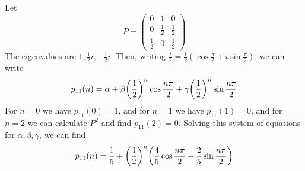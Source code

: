 \begin{example}
	Let
	\[
		P = \begin{pmatrix}
			0           & 1           & 0           \\
			0           & \frac{1}{2} & \frac{1}{2} \\
			\frac{1}{2} & 0           & \frac{1}{2}
		\end{pmatrix}
	\]
	The eigenvalues are \( 1, \frac{1}{2}i, -\frac{1}{2}i \).
	Then, writing \( \frac{i}{2} = \frac{1}{2} (\cos \frac{\pi}{2} + i \sin \frac{\pi}{2} ) \), we can write
	\[
		p_{11}(n) = \alpha + \beta \qty(\frac{1}{2})^n \cos \frac{n \pi}{2} + \gamma \qty(\frac{1}{2})^n \sin \frac{n \pi}{2}
	\]
	For \( n = 0 \) we have \( p_{11}(0) = 1 \), and for \( n = 1 \) we have \( p_{11}(1) = 0 \), and for \( n = 2 \) we can calculate \( P^2 \) and find \( p_{11}(2) = 0 \).
	Solving this system of equations for \( \alpha, \beta, \gamma \), we can find
	\[
		p_{11}(n) = \frac{1}{5} + \qty(\frac{1}{2})^n \qty(\frac{4}{5}\cos \frac{n \pi}{2} - \frac{2}{5}\sin \frac{n \pi}{2} )
	\]
\end{example}
